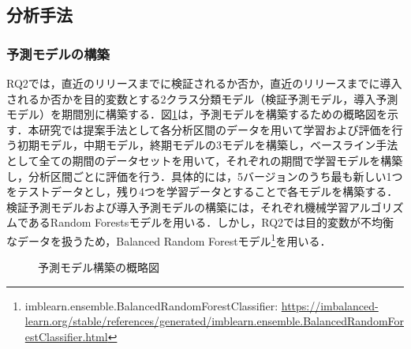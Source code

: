 \documentclass[T,J]{fose} %
\begin{document}
\subsection{分析手法}

\subsubsection{予測モデルの構築}
RQ2では，直近のリリースまでに検証されるか否か，直近のリリースまでに導入されるか否かを目的変数とする2クラス分類モデル（検証予測モデル，導入予測モデル）を期間別に構築する．図\ref{fig:predict_schematic}は，予測モデルを構築するための概略図を示す．本研究では提案手法として各分析区間のデータを用いて学習および評価を行う初期モデル，中期モデル，終期モデルの3モデルを構築し，ベースライン手法として全ての期間のデータセットを用いて，それぞれの期間で学習モデルを構築し，分析区間ごとに評価を行う．具体的には，5バージョンのうち最も新しい1つをテストデータとし，残り4つを学習データとすることで各モデルを構築する．
検証予測モデルおよび導入予測モデルの構築には，それぞれ機械学習アルゴリズムであるRandom Forestsモデル\cite{randomforest}を用いる．しかし，RQ2では目的変数が不均衡なデータを扱うため，Balanced Random Forestモデル\footnote{imblearn.ensemble.BalancedRandomForestClassifier: \url{https://imbalanced-learn.org/stable/references/generated/imblearn.ensemble.BalancedRandomForestClassifier.html}}を用いる．

\begin{figure}[t]
\begin{center}
\caption{予測モデル構築の概略図}
\label{fig:predict_schematic}
\end{center}
\end{figure}
\end{document}

